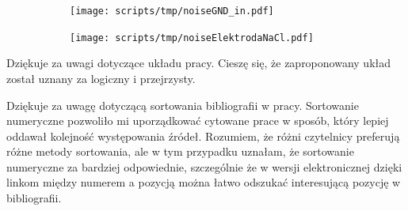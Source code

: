 \begin{frame}[t]
    \begin{block}{\dk}
    \end{block}
    \begin{figure}[H]
        \centering
        \begin{subfigure}[b]{0.485\textwidth}
            \centering
            \texttt{[image: scripts/tmp/noiseGND\_in.pdf]}
        \end{subfigure}
        \begin{subfigure}[b]{0.485\textwidth}
            \centering
            \texttt{[image: scripts/tmp/noiseElektrodaNaCl.pdf]}
        \end{subfigure}     
    \end{figure}
\end{frame}


\begin{frame}[t]
    \begin{block}{\tb}
    \end{block}

    \begin{block}{\tb}
    \end{block}

    Dziękuje za uwagi dotyczące układu  pracy. Cieszę się, że zaproponowany  układ został uznany za logiczny i przejrzysty. 
    \begin{block}{\tb}
    \end{block}
    {\renewcommand\normalsize{\scriptsize}%
    \normalsize
        Dziękuje za uwagę dotyczącą sortowania bibliografii w pracy. 
        Sortowanie numeryczne pozwoliło mi uporządkować cytowane prace w sposób, który lepiej oddawał kolejność występowania źródeł. 
        Rozumiem, że różni czytelnicy preferują różne metody sortowania, ale w tym przypadku uznałam, że sortowanie numeryczne za bardziej odpowiednie, szczególnie że w wersji elektronicznej dzięki linkom między numerem a pozycją można łatwo odszukać interesującą pozycję w bibliografii.
    }
\end{frame}

